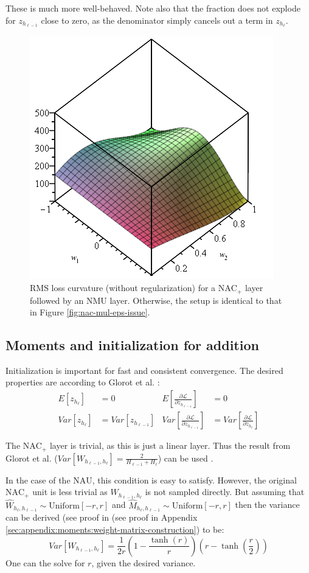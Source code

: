These is much more well-behaved. Note also that the fraction does not explode for $z_{h_{\ell-1}}$ close to zero, as the denominator simply cancels out a term in $z_{h_\ell}$.

\begin{figure}[H]
\centering
\includegraphics[width=0.33\linewidth]{graphics/nac-mul-nmu.png}
\caption{RMS loss curvature (without regularization) for a $\mathrm{NAC}_{+}$ layer followed by an $\mathrm{NMU}$ layer. Otherwise, the setup is identical to that in Figure \ref{fig:nac-mul-eps-issue}.}
\end{figure}

\subsection{Moments and initialization for addition}

Initialization is important for fast and consistent convergence. The desired properties are according to Glorot et al. \cite{glorot-initialization}:
\begin{equation}
\begin{aligned}
E[z_{h_\ell}] &= 0 & E\left[\frac{\partial \mathcal{L}}{\partial z_{h_{\ell-1}}}\right] &= 0 \\
Var[z_{h_\ell}] &= Var\left[z_{h_{\ell-1}}\right] &
Var\left[\frac{\partial \mathcal{L}}{\partial z_{h_{\ell-1}}}\right] &= Var\left[\frac{\partial \mathcal{L}}{\partial z_{h_{\ell}}}\right]
\end{aligned}
\end{equation}

The $\mathrm{NAC}_{+}$ layer is trivial, as this is just a linear layer. Thus the result from Glorot et al. ($Var[W_{h_{\ell-1},h_{\ell}}] = \frac{2}{H_{\ell-1} + H_{\ell}}$) can be used \cite{glorot-initialization}.

In the case of the $\mathrm{NAU}$, this condition is easy to satisfy. However, the original $\mathrm{NAC}_{+}$ unit is less trivial as $W_{h_{\ell-1},h_{\ell}}$ is not sampled directly. But assuming that $\hat{W}_{h_\ell, h_{\ell-1}} \sim \mathrm{Uniform}[-r, r]$ and $\hat{M}_{h_\ell, h_{\ell-1}} \sim \mathrm{Uniform}[-r, r]$ then the variance can be derived (see proof in (see proof in Appendix \ref{sec:appendix:moments:weight-matrix-construction}) to be:
\begin{equation}
Var[W_{h_{\ell-1},h_{\ell}}] = \frac{1}{2r} \left(1 - \frac{\tanh(r)}{r}\right) \left(r - \tanh\left(\frac{r}{2}\right)\right)
\end{equation}
One can the solve for $r$, given the desired variance. 

